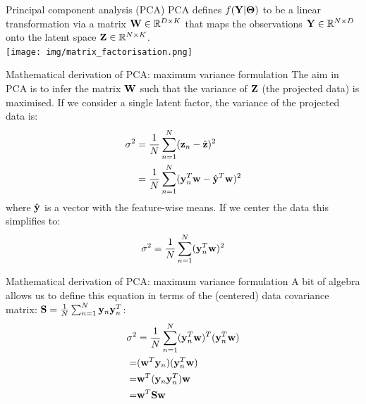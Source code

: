 \documentclass[aspectratio=169,notes]{beamer}
\begin{document}
	\begin{frame}{Principal component analysis (PCA)}
	PCA defines $f({\bf Y}|\mbox{\boldmath $\Theta$})$ to be a linear transformation via a matrix ${\bf W} \in \mathbb{R}^{D \times K}$ that maps the observations ${\bf Y} \in \mathbb{R}^{N \times D}$ onto the latent space ${\bf Z} \in \mathbb{R}^{N \times K}$.\\
	\leavevmode\newline
	\centering
	\texttt{[image: img/matrix\_factorisation.png]}
	\end{frame}


	\begin{frame}{Mathematical derivation of PCA: maximum variance formulation}
	The aim in PCA is to infer the matrix ${\bf W}$ such that the variance of ${\bf Z}$ (the projected data) is maximised. If we consider a single latent factor, the variance of the projected data is:
	\begin{align*}
		\sigma^2 &= \frac{1}{N}\sum_{n=1}^{N} ({\bf z}_n - \hat{{\bf z}})^{2} \\
				 &= \frac{1}{N}\sum_{n=1}^{N} ({\bf y}_n^T {\bf w} - \hat{{\bf y}}^T{\bf w})^{2}
	\end{align*}
	where $\hat{{\bf y}}$ is a vector with the feature-wise means. If we center the data this simplifies to:
	\begin{equation*}
		\sigma^2 = \frac{1}{N}\sum_{n=1}^{N} ({\bf y}_n^T {\bf w})^{2}
	\end{equation*}
	\end{frame}

	\begin{frame}{Mathematical derivation of PCA: maximum variance formulation}
	A bit of algebra allows us to define this equation in terms of the (centered) data covariance matrix: ${\bf S} = \frac{1}{N}\sum_{n=1}^{N} {\bf y}_n{\bf y}_n^T$:
	\begin{align*}
		\sigma^2 &= \frac{1}{N}\sum_{n=1}^{N} ({\bf y}_n^T {\bf w})^T ({\bf y}_n^T {\bf w}) \\
		=& ({\bf w}^T {\bf y}_n) ({\bf y}_n^T {\bf w}) \\
		=& {\bf w}^T ({\bf y}_n {\bf y}_n^T) {\bf w} \\
		=& {\bf w}^T {\bf S} {\bf w}
	\end{align*}
	\end{frame}
\end{document}
